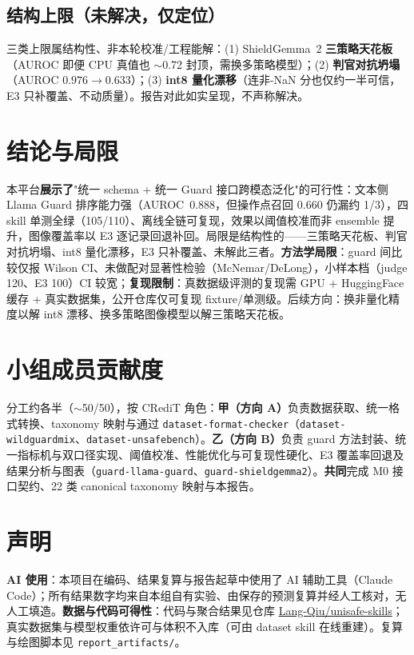 \documentclass[11pt]{ctexart}
\begin{document}
\subsection{结构上限（未解决，仅定位）}
三类上限属结构性、非本轮校准/工程能解：(1) ShieldGemma~2 \textbf{三策略天花板}（AUROC 即便 CPU 真值也 $\sim$0.72 封顶，需换多策略模型）；(2) \textbf{判官对抗坍塌}（AUROC $0.976 \to 0.633$）；(3) \textbf{int8 量化漂移}（连非-NaN 分也仅约一半可信，E3 只补覆盖、不动质量）。报告对此如实呈现，不声称解决。

\section{结论与局限}
本平台\textbf{展示了}"统一 schema + 统一 Guard 接口跨模态泛化"的可行性：文本侧 Llama Guard 排序能力强（AUROC~0.888，但操作点召回 0.660 仍漏约 1/3），四 skill 单测全绿（105/110）、离线全链可复现，效果以阈值校准而非 ensemble 提升，图像覆盖率以 E3 逐记录回退补回。局限是结构性的——三策略天花板、判官对抗坍塌、int8 量化漂移，E3 只补覆盖、未解此三者。\textbf{方法学局限}：guard 间比较仅报 Wilson CI、未做配对显著性检验（McNemar/DeLong），小样本档（judge 120、E3 100）CI 较宽；\textbf{复现限制}：真数据级评测的复现需 GPU + HuggingFace 缓存 + 真实数据集，公开仓库仅可复现 fixture/单测级。后续方向：换非量化精度以解 int8 漂移、换多策略图像模型以解三策略天花板。

\section{小组成员贡献度}
分工约各半（$\sim$50/50），按 CRediT 角色：\textbf{甲（方向 A）}负责数据获取、统一格式转换、taxonomy 映射与通过 \texttt{dataset-format-checker}（\texttt{dataset-wildguardmix}、\texttt{dataset-unsafebench}）。\textbf{乙（方向 B）}负责 guard 方法封装、统一指标机与双口径实现、阈值校准、性能优化与可复现性硬化、E3 覆盖率回退及结果分析与图表（\texttt{guard-llama-guard}、\texttt{guard-shieldgemma2}）。\textbf{共同}完成 M0 接口契约、22 类 canonical taxonomy 映射与本报告。

\section*{声明}
\textbf{AI 使用}：本项目在编码、结果复算与报告起草中使用了 AI 辅助工具（Claude Code）；所有结果数字均来自本组自有实验、由保存的预测复算并经人工核对，无人工填造。\textbf{数据与代码可得性}：代码与聚合结果见仓库 \href{https://github.com/Lang-Qiu/unisafe-skills}{Lang-Qiu/unisafe-skills}；真实数据集与模型权重依许可与体积不入库（可由 dataset skill 在线重建）。复算与绘图脚本见 \texttt{report\_artifacts/}。
\end{document}
